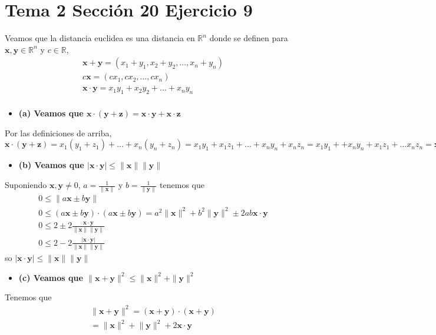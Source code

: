 \documentclass{article}
\newcommand{\vect}[1]{\boldsymbol{#1}}
\begin{document}
\section{Tema 2 Sección 20 Ejercicio 9}
Veamos que la distancia euclidea es una distancia en $\mathbb{R}^n$ donde se definen para $\vect{x},\vect{y}\in\mathbb{R}^n$ y $c\in \mathbb{R}$,
\begin{eqnarray}
\vect{x}+\vect{y}=(x_1+y_1,x_2+y_2,...,x_n+y_n)\nonumber\\
c\vect{x}=(cx_1,cx_2,...,cx_n)\nonumber\\
\vect{x}\cdot\vect{y}=x_1y_1+x_2y_2+...+x_ny_n\nonumber\\
\end{eqnarray}
\begin{itemize}
\item \bf (a) \rm Veamos que $\vect{x}\cdot(\vect{y}+\vect{z})=
\vect{x}\cdot\vect{y}+\vect{x}\cdot\vect{z}$
\end{itemize}
Por las definiciones de arriba, $\vect{x}\cdot(\vect{y}+\vect{z})=x_1(y_1+z_1)+...+x_n(y_n+z_n)=x_1y_1+x_1z_1+...+x_ny_n+x_nz_n=x_1y_1++x_ny_n+x_1z_1+...x_nz_n=\vect{x}\cdot\vect{y}+\vect{x}\cdot\vect{z}$
\begin{itemize}
\item \bf (b) \rm Veamos que $|\vect{x}\cdot \vect{y}|\leq \rVert\vect{x}\lVert \rVert \vect{y}\lVert$
\end{itemize}
Suponiendo $\vect{x},\vect{y}\neq 0$, $a=\frac{1}{\rVert \vect{x}\lVert}$ y $b=\frac{1}{\rVert \vect{y}\lVert}$ tenemos que 
\begin{eqnarray}
0\leq \lVert a\vect{x}\pm b\vect{y}\rVert \nonumber\\
0\leq(a\vect{x}\pm b\vect{y})\cdot(a\vect{x}\pm b\vect{y})=a^2\lVert \vect{x}\rVert^2 +b^2\lVert \vect{y}\rVert^2\pm 2 ab\vect{x}\cdot\vect{y}\nonumber\\
0\leq 2\pm 2 \frac{\vect{x}\cdot\vect{y}}{\lVert \vect{x}\rVert \lVert \vect{y}\rVert}\nonumber\\
0\leq 2- 2 \frac{|\vect{x}\cdot\vect{y}|}{\lVert \vect{x}\rVert \lVert \vect{y}\rVert}
\end{eqnarray}
so $ |\vect{x}\cdot\vect{y}|\leq\lVert \vect{x}\rVert \lVert \vect{y}\rVert$
\begin{itemize}
\item \bf (c) \rm Veamos que $\rVert\vect{x}+ \vect{y}\rVert^2\leq \rVert\vect{x}\lVert^2+ \rVert \vect{y}\lVert^2$
\end{itemize}
Tenemos que
\begin{eqnarray}
\rVert\vect{x}+ \vect{y}\rVert^2=(\vect{x}+\vect{y})\cdot(\vect{x}+\vect{y})\nonumber\\
=\lVert \vect{x}\rVert^2 +\lVert \vect{y}\rVert^2+ 2\vect{x}\cdot\vect{y}\nonumber
\end{eqnarray}
\end{document}
